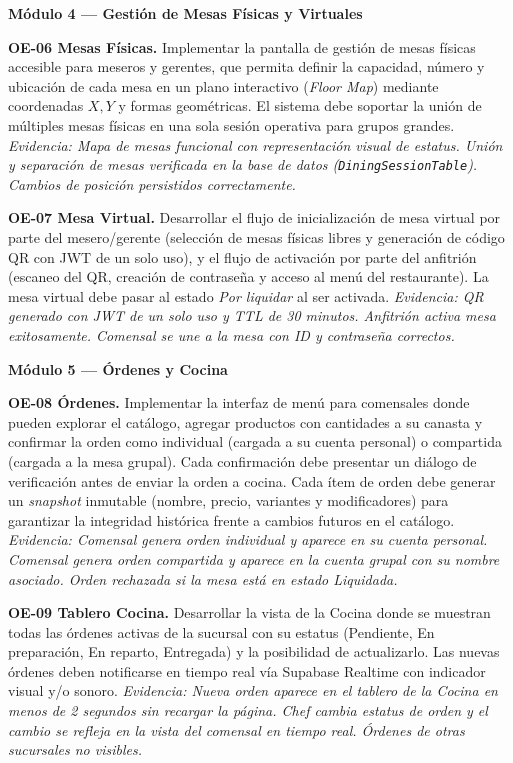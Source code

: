 \noindent\textbf{Módulo 4 — Gestión de Mesas Físicas y Virtuales}

\noindent\textbf{OE-06 Mesas Físicas.}
Implementar la pantalla de gestión de mesas físicas accesible para meseros y
gerentes, que permita definir la capacidad, número y ubicación de cada mesa en un
plano interactivo (\textit{Floor Map}) mediante coordenadas $X, Y$ y formas
geométricas. El sistema debe soportar la unión de múltiples mesas físicas en una
sola sesión operativa para grupos grandes.
\textit{Evidencia: Mapa de mesas funcional con representación visual de estatus.
Unión y separación de mesas verificada en la base de datos (\texttt{DiningSessionTable}).
Cambios de posición persistidos correctamente.}

\noindent\textbf{OE-07 Mesa Virtual.}
Desarrollar el flujo de inicialización de mesa virtual por parte del mesero/gerente
(selección de mesas físicas libres y generación de código QR con JWT de un solo
uso), y el flujo de activación por parte del anfitrión (escaneo del QR, creación
de contraseña y acceso al menú del restaurante). La mesa virtual debe pasar al
estado \textit{Por liquidar} al ser activada.
\textit{Evidencia: QR generado con JWT de un solo uso y TTL de 30 minutos.
Anfitrión activa mesa exitosamente. Comensal se une a la mesa con ID y contraseña correctos.}

\noindent\textbf{Módulo 5 — Órdenes y Cocina}

\noindent\textbf{OE-08 Órdenes.}
Implementar la interfaz de menú para comensales donde pueden explorar el catálogo,
agregar productos con cantidades a su canasta y confirmar la orden como individual
(cargada a su cuenta personal) o compartida (cargada a la mesa grupal). Cada
confirmación debe presentar un diálogo de verificación antes de enviar la orden a
cocina. Cada ítem de orden debe generar un \textit{snapshot} inmutable (nombre,
precio, variantes y modificadores) para garantizar la integridad histórica frente
a cambios futuros en el catálogo.
\textit{Evidencia: Comensal genera orden individual y aparece en su cuenta personal.
Comensal genera orden compartida y aparece en la cuenta grupal con su nombre
asociado. Orden rechazada si la mesa está en estado \textit{Liquidada}.}

\noindent\textbf{OE-09 Tablero Cocina.}
Desarrollar la vista de la Cocina donde se muestran todas las órdenes activas de la
sucursal con su estatus (Pendiente, En preparación, En reparto, Entregada) y la
posibilidad de actualizarlo. Las nuevas órdenes deben notificarse en tiempo real
vía Supabase Realtime con indicador visual y/o sonoro.
\textit{Evidencia: Nueva orden aparece en el tablero de la Cocina en menos de 2 segundos
sin recargar la página. Chef cambia estatus de orden y el cambio se refleja en la
vista del comensal en tiempo real. Órdenes de otras sucursales no visibles.}

